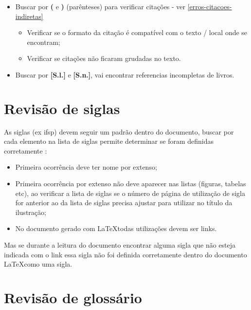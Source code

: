 \begin{itemize}
    \item Buscar por \textbf{(} e \textbf{)} (parênteses) para verificar citações - ver \autoref{erros-citacoes-indiretas}
        \begin{itemize}
            \item Verificar se o formato da citação é compatível com o texto / local onde se encontram;
            
            \item Verificar se citações não ficaram grudadas no texto.
        \end{itemize}
            
    \item Buscar por \textbf{[S.l.]} e \textbf{[S.n.]}, vai encontrar referencias incompletas de livros.
\end{itemize}

\section{Revisão de siglas}
\label{buscas-siglas}

As siglas (ex \ac{ifsp}) devem seguir um padrão dentro do documento, buscar por cada elemento na lista de siglas permite determinar se foram definidas corretamente :

\begin{itemize}
    \item Primeira ocorrência deve ter nome por extenso;
    
    \item Primeira ocorrência por extenso não deve aparecer nas listas (figuras, tabelas etc), ao verificar a lista de siglas se o número de página de utilização de sigla for anterior ao da lista de siglas precisa ajustar para utilizar  no título da ilustração;

    \item No documento gerado com \LaTeX \space todas utilizações devem ser links.
\end{itemize}

Mas se durante a leitura do documento encontrar alguma sigla que não esteja indicada com o link essa sigla não foi definida corretamente dentro do documento \LaTeX  \space como uma sigla.

\section{Revisão de glossário}
\label{buscas-glossario}

